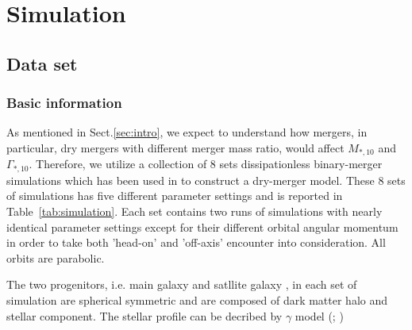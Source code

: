 \documentclass[fleqn,usenatbib]{mnras}
\begin{document}
\section{Simulation}
\label{sec:3}
\subsection{Data set}
\subsubsection{Basic information}
As mentioned in Sect.\ref{sec:intro}, we expect to understand how mergers, in particular, dry mergers with different merger mass ratio, would affect $M_{*,10}$ and $\Gamma_{*,10}$. 
Therefore, we utilize a collection of 8 sets dissipationless binary-merger simulations which has been used in \cite{sonnenfeld2014} to construct a dry-merger model. These 8 sets of simulations has five different parameter settings and is reported in Table~\ref{tab:simulation}. 
Each set contains two runs of simulations with nearly identical parameter settings except for their different orbital angular momentum in order to take both 'head-on' and 'off-axis' encounter into consideration. All orbits are parabolic.   
\begin{table}
    \renewcommand\arraystretch{1.5}
    \centering
    \caption{Simulation parameters for different sets of simulation. }
    \label{tab:simulation}
\end{table}
\par The two progenitors, i.e. main galaxy and satllite galaxy , in each set of simulation are spherical symmetric and are composed of dark matter halo and stellar component. The stellar profile can be decribed by $\gamma$ model (\cite{Dehnen93}; \cite{Tremaine94})
\end{document}
